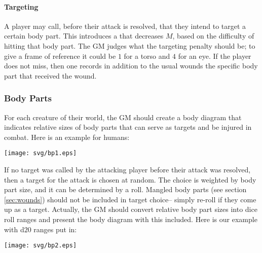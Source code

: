 \paragraph{Targeting}
A player may call, before their attack is resolved, that they intend to target a certain body part.
This introduces a  that decreases $M$, based on the difficulty of hitting that body part.
The GM judges what the targeting penalty should be;
to give a frame of reference it could be $1$ for a torso and $4$ for an eye.
If the player does not miss, then one records in addition to the usual wounds the specific body part that received the wound.


\subsubsection{Body Parts}\label{sec:bodyparts}

For each creature of their world, the GM should create a body diagram
that indicates relative sizes of body
parts that can serve as targets and be injured in combat.
Here is an example for humans:
\begin{center} \texttt{[image: svg/bp1.eps]} \end{center}

If no target was called by the attacking player before their attack was resolved, then a target
for the attack is chosen at random. The choice is weighted by body part size,
and it can be determined by a roll.
Mangled body parts (see section \ref{sec:wounds}) should not be included in target choice--
simply re-roll if they come up as a target.
Actually, the GM should convert relative body part sizes into dice roll ranges
and present the body diagram with this included.
Here is our example with d$20$ ranges put in:

\begin{center} \texttt{[image: svg/bp2.eps]} \end{center}

